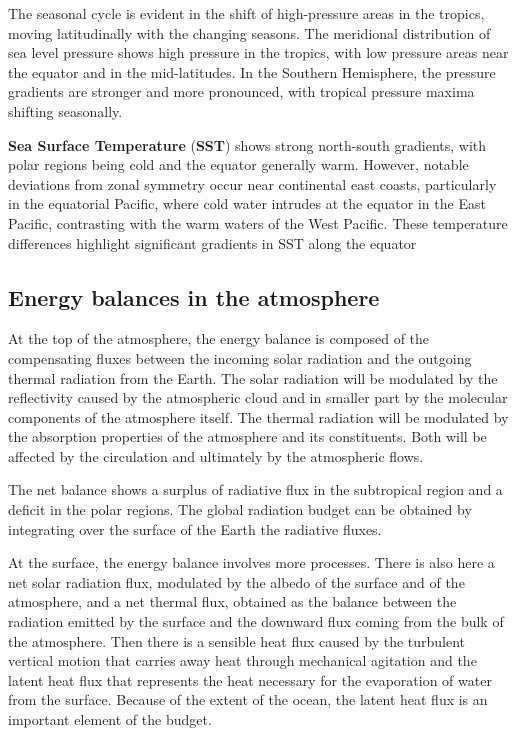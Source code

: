 The seasonal cycle is evident in the shift of high-pressure areas in the tropics, moving latitudinally with the changing seasons. The meridional distribution of sea level pressure shows high pressure in the tropics, with low pressure areas near the equator and in the mid-latitudes. In the Southern Hemisphere, the pressure gradients are stronger and more pronounced, with tropical pressure maxima shifting seasonally.

\textbf{Sea Surface Temperature} (\textbf{SST}) shows strong north-south gradients, with polar regions being cold and the equator generally warm. However, notable deviations from zonal symmetry occur near continental east coasts, particularly in the equatorial Pacific, where cold water intrudes at the equator in the East Pacific, contrasting with the warm waters of the West Pacific. These temperature differences highlight significant gradients in SST along the equator


\subsection{Energy balances in the atmosphere}

At the top of the atmosphere, the energy balance is composed of the compensating fluxes between the incoming solar radiation and the outgoing thermal radiation from the Earth. The solar radiation will be modulated by the reflectivity caused by the atmospheric cloud and in smaller part by the molecular components of the atmosphere itself. The thermal radiation will be modulated by the absorption properties of the atmosphere and its constituents. Both will be affected by the circulation and ultimately by the atmospheric flows.

The net balance shows a surplus of radiative flux in the subtropical region and a deficit in the polar regions. The global radiation budget can be obtained by integrating over the surface of the Earth the radiative fluxes.

At the surface, the energy balance involves more processes. There is also here a net solar radiation flux, modulated by the albedo of the surface and of the atmosphere, and a net thermal flux, obtained as the balance between the radiation emitted by the surface and the downward flux coming from the bulk of the atmosphere. Then there is a sensible heat flux caused by the turbulent vertical motion that carries away heat through mechanical agitation and the latent heat flux that represents the heat necessary for the evaporation of water from the surface. Because of the extent of the ocean, the latent heat flux is an important element of the budget.


